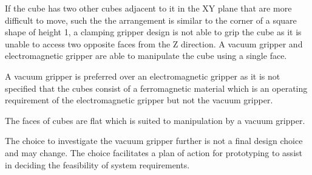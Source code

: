 \begin{compactitem}
    \item If the cube has two other cubes adjacent to it in the XY plane that are more difficult to move, such the the arrangement is similar to the corner of a square shape of height 1, a clamping gripper design is not able to grip the cube as it is unable to access two opposite faces from the Z direction. A vacuum gripper and electromagnetic gripper are able to manipulate the cube using a single face.
    \item A vacuum gripper is preferred over an electromagnetic gripper as it is not specified that the cubes consist of a ferromagnetic material which is an operating requirement of the electromagnetic gripper but not the vacuum gripper.
    \item The faces of cubes are flat which is suited to manipulation by a vacuum gripper.
\end{compactitem}

The choice to investigate the vacuum gripper further is not a final design choice and may change. The choice facilitates a plan of action for prototyping to assist in deciding the feasibility of system requirements.

\pendsign